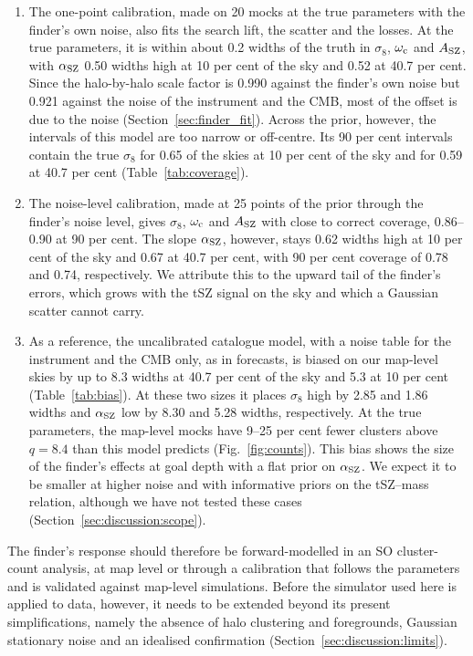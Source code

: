 \begin{enumerate}
instrument and the CMB, because the maps also contain the tSZ signal of faint haloes. In addition, the
finder's search over positions and sizes raises the $q$ of faint clusters, giving a search lift of
$k=1.37$ in equation~(\ref{eq:qobs_fit}) against the finder's own noise. Neighbours widen the scatter
($w=1.09$) and cause nearly all of the lost matches, which amount to 1.0 per cent of the haloes. Finally,
the finder's errors are not Gaussian but have an upward tail (Section~\ref{sec:finder_tail}).
\item The one-point calibration, made on 20 mocks at the true parameters with the finder's own noise, also
fits the search lift, the scatter and the losses. At the true parameters, it is within about 0.2 widths of
the truth in $\sigma_8$, $\omega_\mathrm{c}$ and $A_\mathrm{SZ}$, with $\alpha_\mathrm{SZ}$ 0.50 widths high at 10 per cent of the sky and
0.52 at 40.7 per cent. Since the halo-by-halo scale factor is 0.990 against the finder's own noise but
0.921 against the noise of the instrument and the CMB, most of the offset is due to the noise
(Section~\ref{sec:finder_fit}). Across the prior, however, the intervals of this model are too narrow or
off-centre. Its 90 per cent intervals contain the true $\sigma_8$ for 0.65 of the skies at 10 per cent of
the sky and for 0.59 at 40.7 per cent (Table~\ref{tab:coverage}).
\item The noise-level calibration, made at 25 points of the prior through the finder's noise level, gives
$\sigma_8$, $\omega_\mathrm{c}$ and $A_\mathrm{SZ}$ with close to correct coverage, 0.86--0.90 at 90 per cent. The slope $\alpha_\mathrm{SZ}$,
however, stays 0.62 widths high at 10 per cent of the sky and 0.67 at 40.7 per cent, with 90 per cent
coverage of 0.78 and 0.74, respectively. We attribute this to the upward tail of the finder's errors,
which grows with the tSZ signal on the sky and which a Gaussian scatter cannot carry.
\item As a reference, the uncalibrated catalogue model, with a noise table for the instrument and the CMB
only, as in forecasts, is biased on our map-level skies by up to 8.3 widths at 40.7 per cent of the sky
and 5.3 at 10 per cent (Table~\ref{tab:bias}). At these two sizes it places $\sigma_8$ high by 2.85 and
1.86 widths and $\alpha_\mathrm{SZ}$ low by 8.30 and 5.28 widths, respectively. At the true parameters, the map-level mocks have 9--25 per
cent fewer clusters above $q=8.4$ than this model predicts (Fig.~\ref{fig:counts}). This bias shows the
size of the finder's effects at goal depth with a flat prior on $\alpha_\mathrm{SZ}$. We expect it to be smaller at higher noise and with informative priors on the tSZ--mass relation, although we have not tested these
cases (Section~\ref{sec:discussion:scope}).
\end{enumerate}

The finder's response should therefore be forward-modelled in an SO cluster-count analysis, at map level or
through a calibration that follows the parameters and is validated against map-level simulations. Before
the simulator used here is applied to data, however, it needs to be extended beyond its present
simplifications, namely the absence of halo clustering and foregrounds, Gaussian stationary noise and an
idealised confirmation (Section~\ref{sec:discussion:limits}).

